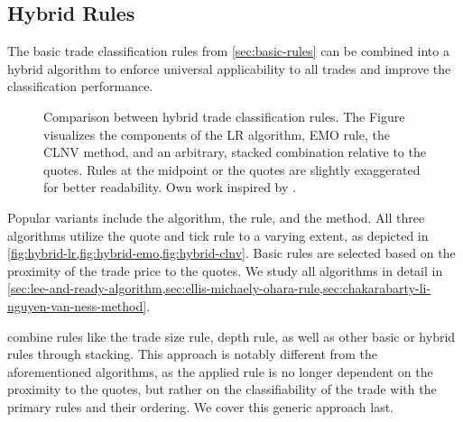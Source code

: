 \subsection{Hybrid Rules}\label{sec:hybrid-rules}

The basic trade classification rules from \cref{sec:basic-rules} can be combined into a hybrid algorithm to enforce universal applicability to all trades and improve the classification performance.


\begin{figure}[ht!]
  \hfill%
  \hfill%
  \hfill%
  \caption[Comparison Between Hybrid Trade Classification Rules]{Comparison between hybrid trade classification rules. The Figure visualizes the components of the \acrshort{LR} algorithm, \acrshort{EMO} rule, the \acrshort{CLNV} method, and an arbitrary, stacked combination relative to the quotes. Rules at the midpoint or the quotes are slightly exaggerated for better readability. Own work inspired by \textcite[][167]{poppeSensitivityVPINChoice2016}.}
  \label{fig:hybrid-algorithms}
\end{figure}

Popular variants include the  algorithm, the  rule, and the  method. All three algorithms utilize the quote and tick rule to a varying extent, as depicted in \cref{fig:hybrid-lr,fig:hybrid-emo,fig:hybrid-clnv}. Basic rules are selected based on the proximity of the trade price to the quotes. We study all algorithms in detail in \cref{sec:lee-and-ready-algorithm,sec:ellis-michaely-ohara-rule,sec:chakarabarty-li-nguyen-van-ness-method}.

\textcite[][18]{grauerOptionTradeClassification2022} combine rules like the trade size rule, depth rule, as well as other basic or hybrid rules through stacking. This approach is notably different from the aforementioned algorithms, as the applied rule is no longer dependent on the proximity to the quotes, but rather on the classifiability of the trade with the primary rules and their ordering. We cover this generic approach last.
